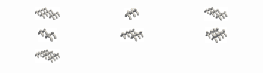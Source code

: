 \documentclass[%
 reprint,
 amsmath,amssymb,
 aps,
 floatfix,
 nofootinbib,
]{revtex4-2}
\begin{document}
\begin{figure}[h!]
  \centering
\begin{center}
\begin{tabular}{ccc}
    \includegraphics[width=0.330\textwidth]{cluster_2.png} &
    \includegraphics[width=0.200\textwidth]{cluster_6.png} &
    \includegraphics[width=0.300\textwidth]{cluster_0.png} \\
    \includegraphics[width=0.249\textwidth]{cluster_3.png} &
    \includegraphics[width=0.319\textwidth]{cluster_4.png} &
    \includegraphics[width=0.289\textwidth]{cluster_5.png} \\
    \includegraphics[width=0.330\textwidth]{cluster_1.png} &

\end{tabular}
\end{center}
\end{figure}
\end{document}
